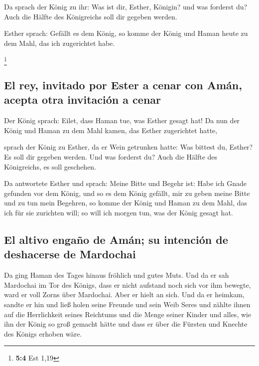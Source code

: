  Da sprach der König zu ihr: Was ist dir, Esther, Königin?
und was forderst du? Auch die Hälfte des Königreichs soll dir gegeben
werden.

 Esther sprach: Gefällt es dem König, so komme der König
und Haman heute zu dem Mahl, das ich zugerichtet habe.

\footnote{\textbf{5:4} Est 1,19}

\hypertarget{el-rey-invitado-por-ester-a-cenar-con-amuxe1n-acepta-otra-invitaciuxf3n-a-cenar}{%
\subsection{El rey, invitado por Ester a cenar con Amán, acepta otra
invitación a
cenar}\label{el-rey-invitado-por-ester-a-cenar-con-amuxe1n-acepta-otra-invitaciuxf3n-a-cenar}}

 Der König sprach: Eilet, dass Haman tue, was Esther
gesagt hat! Da nun der König und Haman zu dem Mahl kamen, das Esther
zugerichtet hatte,

 sprach der König zu Esther, da er Wein getrunken hatte:
Was bittest du, Esther? Es soll dir gegeben werden. Und was forderst du?
Auch die Hälfte des Königreichs, es soll geschehen.

 Da antwortete Esther und sprach: Meine Bitte und Begehr
ist:  Habe ich Gnade gefunden vor dem König, und so es dem
König gefällt, mir zu geben meine Bitte und zu tun mein Begehren, so
komme der König und Haman zu dem Mahl, das ich für sie zurichten will;
so will ich morgen tun, was der König gesagt hat.

\hypertarget{el-altivo-engauxf1o-de-amuxe1n-su-intenciuxf3n-de-deshacerse-de-mardochai}{%
\subsection{El altivo engaño de Amán; su intención de deshacerse de
Mardochai}\label{el-altivo-engauxf1o-de-amuxe1n-su-intenciuxf3n-de-deshacerse-de-mardochai}}

 Da ging Haman des Tages hinaus fröhlich und gutes Muts.
Und da er sah Mardochai im Tor des Königs, dass er nicht aufstand noch
sich vor ihm bewegte, ward er voll Zorns über Mardochai. 
Aber er hielt an sich. Und da er heimkam, sandte er hin und ließ holen
seine Freunde und sein Weib Seres  und zählte ihnen auf
die Herrlichkeit seines Reichtums und die Menge seiner Kinder und alles,
wie ihn der König so groß gemacht hätte und dass er über die Fürsten und
Knechte des Königs erhoben wäre.

